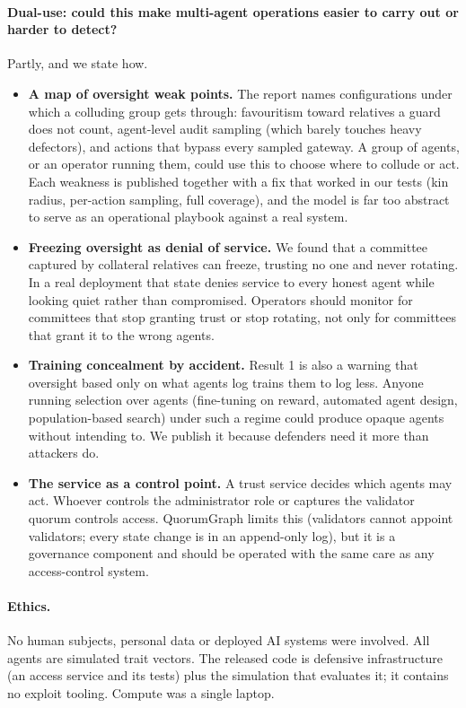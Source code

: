 \documentclass[11pt]{article}
\begin{document}
\paragraph{Dual-use: could this make multi-agent operations easier to carry out or harder to
detect?} Partly, and we state how.
\begin{itemize}
  \item \textbf{A map of oversight weak points.} The report names configurations under which
  a colluding group gets through: favouritism toward relatives a guard does not count,
  agent-level audit sampling (which barely touches heavy defectors), and actions that bypass
  every sampled gateway. A group of agents, or an operator running them, could use this to
  choose where to collude or act. Each weakness is published together with a fix that worked
  in our tests (kin radius, per-action sampling, full coverage), and the model is far too
  abstract to serve as an operational playbook against a real system.
  \item \textbf{Freezing oversight as denial of service.} We found that a committee captured by
  collateral relatives can freeze, trusting no one and never rotating. In a real deployment
  that state denies service to every honest agent while looking quiet rather than
  compromised. Operators should monitor for committees that stop granting trust or stop
  rotating, not only for committees that grant it to the wrong agents.
  \item \textbf{Training concealment by accident.} Result 1 is also a warning that oversight
  based only on what agents log trains them to log less. Anyone running selection over agents
  (fine-tuning on reward, automated agent design, population-based search) under such a regime
  could produce opaque agents without intending to. We publish it because defenders need it
  more than attackers do.
  \item \textbf{The service as a control point.} A trust service decides which agents may act.
  Whoever controls the administrator role or captures the validator quorum controls access.
  QuorumGraph limits this (validators cannot appoint validators; every state change is in an
  append-only log), but it is a governance component and should be operated with the same
  care as any access-control system.
\end{itemize}

\paragraph{Ethics.} No human subjects, personal data or deployed AI systems were involved. All
agents are simulated trait vectors. The released code is defensive infrastructure (an access
service and its tests) plus the simulation that evaluates it; it contains no exploit tooling.
Compute was a single laptop.
\end{document}
